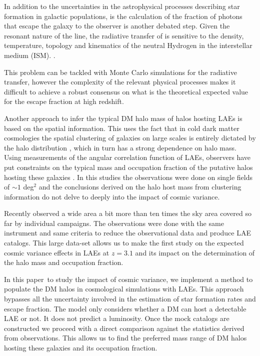 \documentclass[usenatbib]{mn2e}
\newcommand{\documentname}{paper~}
\newcommand{\ly}{{\ifmmode{{\rm Ly}\alpha}\else{Ly$\alpha$~}\fi}}
\begin{document}
In addition to the uncertainties in the astrophysical processes
describing star formation in galactic populations, is the calculation
of the fraction of \ly photons that escape the galaxy to the observer
is another debated step. Given the resonant nature of the \ly line,
the radiative transfer of \ly is sensitive to the density,
temperature, topology and kinematics of the neutral Hydrogen in the
interstellar medium
(ISM). \citep{Neufeld1991,ForeroRomero2011,Dijkstra2012,Laursen2013,Orsi2012}.     

This problem can be tackled with Monte Carlo simulations for the
radiative transfer, however the complexity of the relevant physical
processes makes it difficult to achieve a robust consensus on what is
the theoretical expected value for the \ly escape fraction
at high redshift. 

Another approach to infer the typical DM halo mass of halos hosting
LAEs is based on the spatial information. This uses the fact that in cold
dark matter cosmologies the spatial clustering of galaxies on large
scales is entirely dictated by the halo distribution
\citep{Colberg00}, which in turn has a strong dependence on halo
mass. Using measurements of the angular correlation function of LAEs,
observers have put constraints on the typical mass and occupation
fraction of the putative halos hosting these galaxies
\citep{Hayashino2004,Gawiser07,Nilsson2007,Ouchi2010}. In this
studies the observations were done on single fields of $\sim 1$
deg$^{2}$ and the conclusions derived on the halo host mass from
clustering information do not delve to deeply into the impact of
cosmic variance.

Recently \cite{Yamada2012} observed a wide area a bit more than ten
times the sky area covered so far by individual campaigns. The
observations were done with the same instrument and same criteria to
reduce the observational data and produce LAE catalogs. This large
data-set allows us to make the first study on the expected cosmic
variance effects in LAEs at $z=3.1$ and its impact on the
determination of the halo mass and occupation fraction. 


In this \documentname to study the impact of cosmic variance,
we implement a method to populate the DM halos in cosmological
simulations with LAEs. This approach bypasses all the uncertainty
involved in the estimation of star formation rates and \ly escape
fraction. The model only considers whether a DM can host a
detectable LAE or not. It does not predict a \ly  luminosity. Once the
mock catalogs are constructed  we proceed with a direct comparison
against the statistics derived from observations. This allows us 
to find the preferred mass range of DM halos hosting these galaxies
and its occupation fraction.
\end{document}
